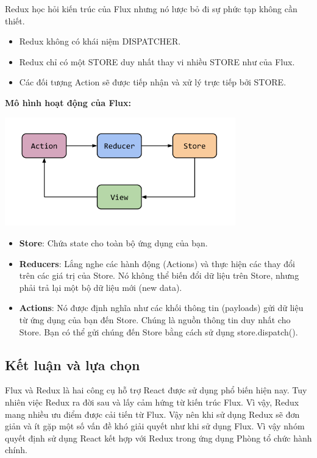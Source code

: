 Redux học hỏi kiến trúc của Flux nhưng nó lược bỏ đi sự phức tạp không cần thiết.
\begin{itemize}
    \item Redux không có khái niệm DISPATCHER.
    \item Redux chỉ có một STORE duy nhất thay vi nhiều STORE như của Flux.
    \item Các đối tượng Action sẽ được tiếp nhận và xử lý trực tiếp bởi STORE.
\end {itemize}
\textbf{Mô hình hoạt động của Flux:}
\begin{center}
  \captionsetup{type=figure}
  \includegraphics[width=10cm]{img/redux-architecture.png}
\end{center}
\begin{itemize}
    \item \textbf{Store}: Chứa state cho toàn bộ ứng dụng của bạn.
    \item \textbf{Reducers}: Lắng nghe các hành động (Actions) và thực hiện các thay đổi trên các giá trị của Store. Nó không thể biến đổi dữ liệu trên Store, nhưng phải trả lại một bộ dữ liệu mới (new data).
    \item \textbf{Actions}: Nó được định nghĩa như các khối thông tin (payloads) gửi dữ liệu từ ứng dụng của bạn đến Store. Chúng là nguồn thông tin duy nhất cho Store. Bạn có thể gửi chúng đến Store bằng cách sử dụng store.dispatch().
\end {itemize}
\subsection{Kết luận và lựa chọn}
Flux và Redux là hai công cụ hỗ trợ React được sử dụng phổ biến hiện nay. Tuy nhiên việc Redux ra đời sau và lấy cảm hứng từ kiến trúc Flux. Vì vậy, Redux mang nhiều ưu điểm được cải tiến từ Flux. Vậy nên khi sử dụng Redux sẽ đơn giản và ít gặp một số vấn đề khó giải quyết như khi sử dụng Flux.
Vì vậy nhóm quyết định sử dụng React kết hợp với Redux trong ứng dụng Phòng tổ chức hành chính.